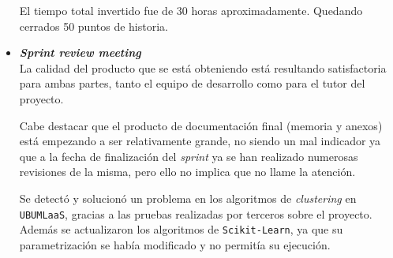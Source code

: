 \begin{itemize}
El tiempo total invertido fue de 30 horas aproximadamente. Quedando cerrados 50 puntos de historia.

\item \textbf{\textit{Sprint review meeting}}\\
La calidad del producto que se está obteniendo está resultando satisfactoria para ambas partes, tanto el equipo de desarrollo como para el tutor del proyecto. 

Cabe destacar que el producto de documentación final (memoria y anexos) está empezando a ser relativamente grande, no siendo un mal indicador ya que a la fecha de finalización del \textit{sprint} ya se han realizado numerosas revisiones de la misma, pero ello no implica que no llame la atención.

Se detectó y solucionó un problema en los algoritmos de \textit{clustering} en \texttt{UBUMLaaS}, gracias a las pruebas realizadas por terceros sobre el proyecto. Además se actualizaron los algoritmos de \texttt{Scikit-Learn}, ya que su parametrización se había modificado y no permitía su ejecución.

\end{itemize}

